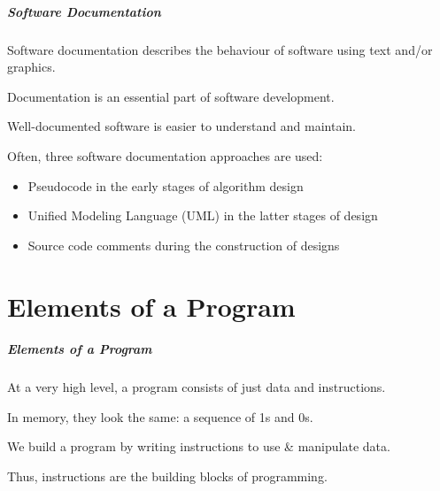 \begin{frame}
\frametitle{Software Documentation}

Software documentation describes the behaviour of software using text and/or graphics.

Documentation is an essential part of software development.

Well-documented software is easier to understand and maintain.

Often, three software documentation approaches are used:

\begin{itemize}
\item Pseudocode in the early stages of algorithm design
\item Unified Modeling Language (UML) in the latter stages of design
\item Source code comments during the construction of designs
\end{itemize}

\end{frame}

\part{Elements of a Program}
\begin{frame}\partpage\end{frame}

\begin{frame}
\frametitle{Elements of a Program}

At a very high level, a program consists of just data and instructions.

In memory, they look the same: a sequence of 1s and 0s.

We build a program by writing instructions to use \& manipulate data.

Thus, instructions are the building blocks of programming.

\end{frame}

